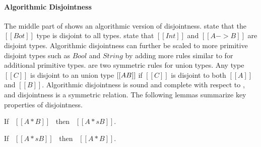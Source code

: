 \begin{comment}
\begin{figure}[t]
  \begin{small}
    \centering
    \drules[ad]{$[[A * B]]$}{Algorithmic Disjointness}{btmr, btml, intl, intr, orl, orr}
  \end{small}
  \caption{Algorithmic Disjointness for \cal.}
  \label{fig:union:ad}
\end{figure}
\end{comment}

\paragraph{Algorithmic Disjointness}
The middle part of  shows an algorithmic
version of disjointness.   state that the $[[Bot]]$
type is disjoint to all types.   state that
$[[Int]]$ and $[[A -> B]]$ are disjoint types.  Algorithmic
disjointness can further be scaled to more primitive disjoint types
such as $Bool$ and $String$ by adding more rules similar to
 for additional primitive types.   are two symmetric rules for union types. Any type $[[C]]$ is
disjoint to an union type $[[A \/ B]]$ if $[[C]]$ is disjoint to both
$[[A]]$ and $[[B]]$.  Algorithmic disjointness is sound and complete
with respect to , and disjointness is a symmetric
relation. The following lemmas summarize key properties of disjointness.

\begin{lemma}
  If \ $[[A * B]]$ \ then \ $[[A *s B]]$.
\label{lemma:union:disj-sound}
\end{lemma}

\begin{comment}
\begin{proof}
  By induction on algorithmic disjointness relation.
  \begin{itemize}
    \item Cases \rref{ad-btmr, ad-btml, ad-orl, ad-orr} require induction on hypothesis
          and \Cref{lemma:union:sub-or}.
    \item Cases \rref{ad-intl, ad-intr} require induction on type and \Cref{lemma:union:sub-or}.
  \end{itemize}
\end{proof}
\end{comment}

\begin{lemma}
  If \ $[[A *s B]]$ \ then \ $[[A * B]]$.
\label{lemma:union:disj-complete}
\end{lemma}

